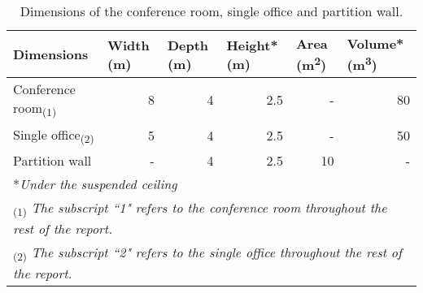 \begin{table}[htbp]
	\caption{Dimensions of the conference room, single office and partition wall.}
	\label{tbl:room_dims}
	\centering
	\begin{tabular}{@{}lrrrrr@{}}
		\toprule
		Dimensions & \multicolumn{1}{l}{Width (m)} & \multicolumn{1}{l}{Depth (m)} & \multicolumn{1}{l}{Height* (m)} & \multicolumn{1}{l}{Area (m\textsuperscript{2})} & \multicolumn{1}{l}{Volume* (m\textsuperscript{3})} \\ \midrule
		Conference room\textsubscript{(1)} & 8 & 4 & 2.5 & - & 80 \\
		Single office\textsubscript{(2)} & 5 & 4 & 2.5 & - & 50 \\
		Partition wall & - & 4 & 2.5 & 10 & - \\ \bottomrule
		\multicolumn{6}{l}{*\textit{Under the suspended ceiling}} \\
		\multicolumn{6}{l}{\textsubscript{(1)} \textit{The subscript ``1" refers to the conference room throughout the rest of the report.}} \\
		\multicolumn{6}{l}{\textsubscript{(2)} \textit{The subscript ``2" refers to the single office throughout the rest of the report.}}
	\end{tabular}
\end{table}